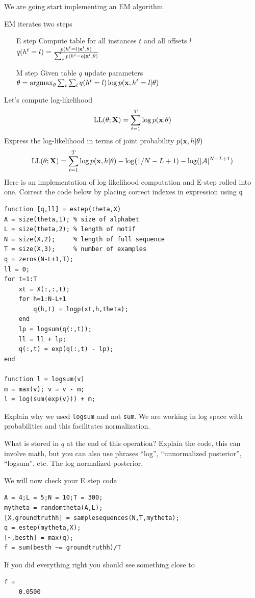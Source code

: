 \documentclass{article}
\begin{document}
{\newproblem{2pt} We are going start implementing an EM algorithm.

EM iterates two steps
\begin{itemize}
\item[E step] Compute table for all instances $t$ and all offsets $l$ $q(h^t = l) = \frac{p(h^t = l|\mathbf{x}^t,\theta)}{\sum_o p(h^t = o|\mathbf{x}^t,\theta)}$
\item[M step] Given table $q$ update parameters $\theta = \mathop{\rm argmax}_\theta \sum_t \sum_l q(h^t = l) \log p(\mathbf{x},h^t = l|\theta)$
\end{itemize}


Let's compute log-likelihood 
\[
\textrm{LL}(\theta;\mathbf{X}) = \sum_{t=1}^T\log p(\mathbf{x}|\theta)
\]
Express the log-likelihood in terms of joint probability $p(\mathbf{x},h|\theta)$ 
\[
\textrm{LL}(\theta;\mathbf{X}) = \sum_{t=1}^T \log p(\mathbf{x},h|\theta) - \log(1/N - L + 1) - \log(|\mathcal{A}|^{N - L + 1})
\]
Here is an implementation of log likelihood computation and E-step rolled into one.
Correct the code below by placing correct indexes in expression using \verb|q|
\begin{verbatim}
function [q,ll] = estep(theta,X)
A = size(theta,1); % size of alphabet
L = size(theta,2); % length of motif
N = size(X,2);     % length of full sequence
T = size(X,3);     % number of examples
q = zeros(N-L+1,T);
ll = 0;
for t=1:T
    xt = X(:,:,t); 
    for h=1:N-L+1
        q(h,t) = logp(xt,h,theta);
    end
    lp = logsum(q(:,t));
    ll = ll + lp;
    q(:,t) = exp(q(:,t) - lp);
end  

function l = logsum(v)
m = max(v); v = v - m;
l = log(sum(exp(v))) + m;
\end{verbatim}
Explain why we used \verb|logsum| and not \verb|sum|. We are working in log space with probabilities and this facilitates normalization.

What is stored in $q$ at the end of this operation? Explain the code, this can involve math, but you can also use
phrases ``log'', ``unnormalized posterior'', ``logsum'', etc.
The log normalized posterior.
 

We will now check your E step code

\begin{verbatim}
A = 4;L = 5;N = 10;T = 300;
mytheta = randomtheta(A,L);
[X,groundtruthh] = samplesequences(N,T,mytheta);
q = estep(mytheta,X);
[~,besth] = max(q);
f = sum(besth ~= groundtruthh)/T
\end{verbatim}

If you did everything right you should see something close to 
\begin{verbatim}
f =
    0.0500
\end{verbatim}

}
\end{document}
